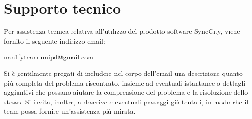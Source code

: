 \documentclass[8pt]{article}
\begin{document}
\section{Supporto tecnico} \label{sec:support}
Per assistenza tecnica relativa all’utilizzo del prodotto software SyncCity, viene fornito il
seguente indirizzo email:
\begin{center}
    \parbox{\linewidth}{\centering
        \href{mailto: nan1fyteam.unipd@gmail.com}{nan1fyteam.unipd@gmail.com}
    }
\end{center}
Si è gentilmente pregati di includere nel corpo dell’email una descrizione quanto più completa del problema riscontrato, 
insieme ad eventuali istantanee o dettagli aggiuntivi che possano aiutare la comprensione del problema e la risoluzione dello stesso.
Si invita, inoltre, a descrivere eventuali passaggi già tentati, in modo che il team possa fornire un’assistenza più mirata.
\end{document}
